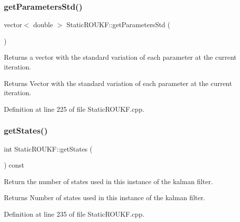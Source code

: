 \subsubsection{\texorpdfstring{get\+Parameters\+Std()}{getParametersStd()}}
{\footnotesize\ttfamily vector$<$ double $>$ Static\+R\+O\+U\+K\+F\+::get\+Parameters\+Std (\begin{DoxyParamCaption}{ }\end{DoxyParamCaption})}

Returns a vector with the standard variation of each parameter at the current iteration. \begin{DoxyReturn}{Returns}
Vector with the standard variation of each parameter at the current iteration. 
\end{DoxyReturn}


Definition at line 225 of file Static\+R\+O\+U\+K\+F.\+cpp.

\mbox{\label{classStaticROUKF_a9896d986a5cb17d1672b3aa8ff5a806d}} 
\subsubsection{\texorpdfstring{get\+States()}{getStates()}}
{\footnotesize\ttfamily int Static\+R\+O\+U\+K\+F\+::get\+States (\begin{DoxyParamCaption}{ }\end{DoxyParamCaption}) const}

Return the number of states used in this instance of the kalman filter. \begin{DoxyReturn}{Returns}
Number of states used in this instance of the kalman filter. 
\end{DoxyReturn}


Definition at line 235 of file Static\+R\+O\+U\+K\+F.\+cpp.

\mbox{\label{classStaticROUKF_a2df76479be92ab63f645eb27184f9a23}} 
